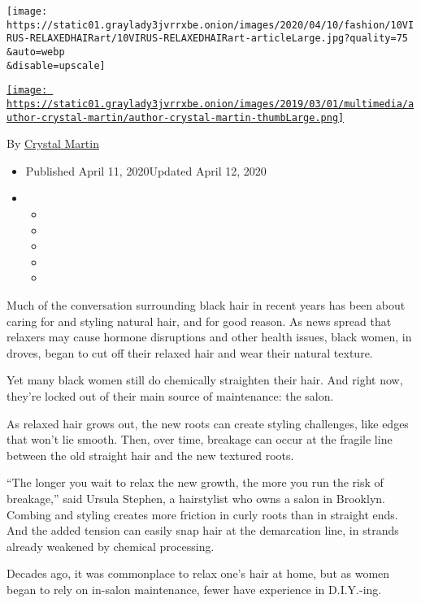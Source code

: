 \texttt{[image: https://static01.graylady3jvrrxbe.onion/images/2020/04/10/fashion/10VIRUS-RELAXEDHAIRart/10VIRUS-RELAXEDHAIRart-articleLarge.jpg?quality=75\\\&auto=webp\\\&disable=upscale]}

\href{https://www.nytimes3xbfgragh.onion/by/crystal-martin}{\texttt{[image: https://static01.graylady3jvrrxbe.onion/images/2019/03/01/multimedia/author-crystal-martin/author-crystal-martin-thumbLarge.png]}}

By \href{https://www.nytimes3xbfgragh.onion/by/crystal-martin}{Crystal
Martin}

\begin{itemize}
\item
  Published April 11, 2020Updated April 12, 2020
\item
  \begin{itemize}
  \item
  \item
  \item
  \item
  \item
  \end{itemize}
\end{itemize}

Much of the conversation surrounding black hair in recent years has been
about caring for and styling natural hair, and for good reason. As news
spread that relaxers may cause hormone disruptions and other health
issues, black women, in droves, began to cut off their relaxed hair and
wear their natural texture.

Yet many black women still do chemically straighten their hair. And
right now, they're locked out of their main source of maintenance: the
salon.

As relaxed hair grows out, the new roots can create styling challenges,
like edges that won't lie smooth. Then, over time, breakage can occur at
the fragile line between the old straight hair and the new textured
roots.

``The longer you wait to relax the new growth, the more you run the risk
of breakage,'' said Ursula Stephen, a hairstylist who owns a salon in
Brooklyn. Combing and styling creates more friction in curly roots than
in straight ends. And the added tension can easily snap hair at the
demarcation line, in strands already weakened by chemical processing.

Decades ago, it was commonplace to relax one's hair at home, but as
women began to rely on in-salon maintenance, fewer have experience in
D.I.Y.-ing.

